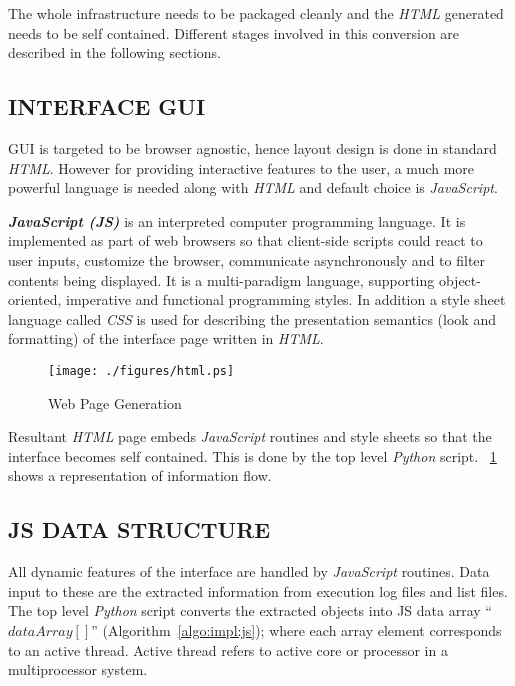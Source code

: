 The whole infrastructure needs to be packaged cleanly and the {\it HTML} generated needs to be self contained. Different stages involved in this conversion are described in the following sections. 

\subsection {INTERFACE GUI}
GUI is targeted to be browser agnostic, hence layout design is done in standard {\it HTML}. However for providing interactive features to the user, a much more powerful language is needed along with {\it HTML} and default choice is {\it JavaScript}.

\emph {\bf JavaScript (JS)} is an interpreted computer programming language. It is  implemented as part of web browsers so that client-side scripts could react to user inputs, customize the browser, communicate asynchronously and to filter contents being displayed. It is a multi-paradigm language, supporting object-oriented, imperative and functional programming styles.  
In addition a style sheet language called {\it CSS} is used for describing the presentation semantics (look and formatting) of the interface page written in {\it HTML}.

\begin{figure}[h]
\centering
\texttt{[image: ./figures/html.ps]}
\caption{Web Page Generation}
\label{fig:html.ps}
\end{figure}

Resultant {\it HTML} page embeds {\it JavaScript} routines and style sheets so that the interface becomes self contained. This is done by the top level {\it Python} script. \figurename{~\ref{fig:html.ps}} shows a representation of information flow.


\subsection{JS DATA STRUCTURE}
All dynamic features of the interface are handled by {\it JavaScript} routines. Data input to these are the extracted information from execution log files and list files. The top level {\it Python} script converts the extracted objects into JS data array ``$dataArray[]$'' (Algorithm~\ref{algo:impl:js}); where each array element corresponds to an active thread. Active thread refers to active core or processor in a multiprocessor system.  

